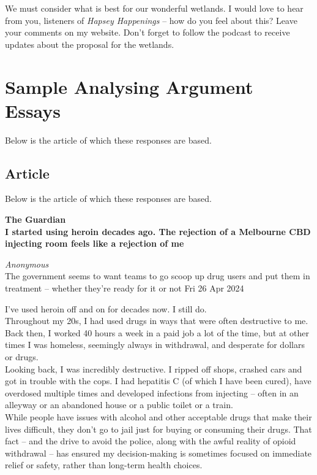 \documentclass[a4paper]{article}
\begin{document}
We must consider what is best for our wonderful wetlands. I would love to hear from you, listeners of \textit{Hapsey Happenings} – how do you feel about this? Leave your comments on my website. Don’t forget to follow the podcast to receive updates about the proposal for the wetlands.\\


\newpage
\section{Sample Analysing Argument Essays}

Below is the article of which these responses are based.

\subsection{Article}
Below is the article of which these responses are based.

\begin{center}
    

\textbf{The Guardian}\\
\textbf{I started using heroin decades ago. The rejection of a Melbourne CBD injecting room feels like a rejection of me}\\
\end{center}
\textit{Anonymous}\\
The government seems to want teams to go scoop up drug users and put them in treatment – whether they’re ready for it or not
Fri 26 Apr 2024

\vspace{1.5cm}

I’ve used heroin off and on for decades now. I still do.\\

Throughout my 20s, I had used drugs in ways that were often destructive to me. Back then, I worked 40 hours a week in a paid job a lot of the time, but at other times I was homeless, seemingly always in withdrawal, and desperate for dollars or drugs.\\

Looking back, I was incredibly destructive. I ripped off shops, crashed cars and got in trouble with the cops. I had hepatitis C (of which I have been cured), have overdosed multiple times and developed infections from injecting – often in an alleyway or an abandoned house or a public toilet or a train.\\

While people have issues with alcohol and other acceptable drugs that make their lives difficult, they don’t go to jail just for buying or consuming their drugs. That fact – and the drive to avoid the police, along with the awful reality of opioid withdrawal – has ensured my decision-making is sometimes focused on immediate relief or safety, rather than long-term health choices.\\
\end{document}
